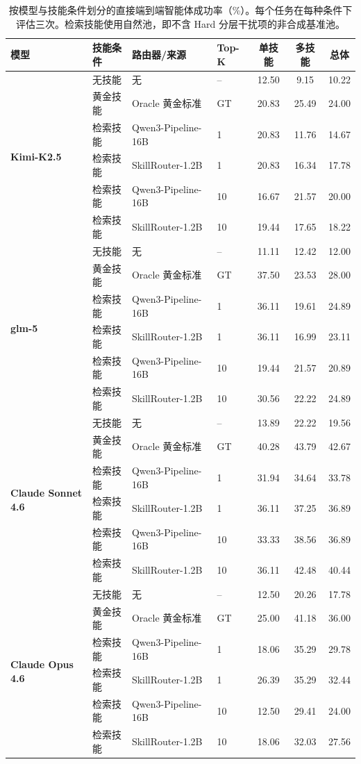 \documentclass[11pt,UTF8,fontset=fandol]{ctexart}
\begin{document}
\begin{table}[H]\centering
\caption{按模型与技能条件划分的直接端到端智能体成功率（\%）。每个任务在每种条件下评估三次。检索技能使用自然池，即不含 Hard 分层干扰项的非合成基准池。}
\small
\begin{tabular}{llllccc}
\toprule
模型 & 技能条件 & 路由器/来源 & Top-K & 单技能 & 多技能 & 总体 \\ \midrule
\multirow{6}{*}{\textbf{Kimi-K2.5}} & 无技能 & 无 & -- & 12.50 & 9.15 & 10.22 \\
 & 黄金技能 & Oracle 黄金标准 & GT & 20.83 & 25.49 & 24.00 \\
 & 检索技能 & Qwen3-Pipeline-16B & 1 & 20.83 & 11.76 & 14.67 \\
 & 检索技能 & SkillRouter-1.2B & 1 & 20.83 & 16.34 & 17.78 \\
 & 检索技能 & Qwen3-Pipeline-16B & 10 & 16.67 & 21.57 & 20.00 \\
 & 检索技能 & SkillRouter-1.2B & 10 & 19.44 & 17.65 & 18.22 \\ \midrule
\multirow{6}{*}{\textbf{glm-5}} & 无技能 & 无 & -- & 11.11 & 12.42 & 12.00 \\
 & 黄金技能 & Oracle 黄金标准 & GT & 37.50 & 23.53 & 28.00 \\
 & 检索技能 & Qwen3-Pipeline-16B & 1 & 36.11 & 19.61 & 24.89 \\
 & 检索技能 & SkillRouter-1.2B & 1 & 36.11 & 16.99 & 23.11 \\
 & 检索技能 & Qwen3-Pipeline-16B & 10 & 19.44 & 21.57 & 20.89 \\
 & 检索技能 & SkillRouter-1.2B & 10 & 30.56 & 22.22 & 24.89 \\ \midrule
\multirow{6}{*}{\textbf{Claude Sonnet 4.6}} & 无技能 & 无 & -- & 13.89 & 22.22 & 19.56 \\
 & 黄金技能 & Oracle 黄金标准 & GT & 40.28 & 43.79 & 42.67 \\
 & 检索技能 & Qwen3-Pipeline-16B & 1 & 31.94 & 34.64 & 33.78 \\
 & 检索技能 & SkillRouter-1.2B & 1 & 36.11 & 37.25 & 36.89 \\
 & 检索技能 & Qwen3-Pipeline-16B & 10 & 33.33 & 38.56 & 36.89 \\
 & 检索技能 & SkillRouter-1.2B & 10 & 36.11 & 42.48 & 40.44 \\ \midrule
\multirow{6}{*}{\textbf{Claude Opus 4.6}} & 无技能 & 无 & -- & 12.50 & 20.26 & 17.78 \\
 & 黄金技能 & Oracle 黄金标准 & GT & 25.00 & 41.18 & 36.00 \\
 & 检索技能 & Qwen3-Pipeline-16B & 1 & 18.06 & 35.29 & 29.78 \\
 & 检索技能 & SkillRouter-1.2B & 1 & 26.39 & 35.29 & 32.44 \\
 & 检索技能 & Qwen3-Pipeline-16B & 10 & 12.50 & 29.41 & 24.00 \\
 & 检索技能 & SkillRouter-1.2B & 10 & 18.06 & 32.03 & 27.56 \\
\bottomrule
\end{tabular}
\label{tab:25}
\end{table}
\end{document}
